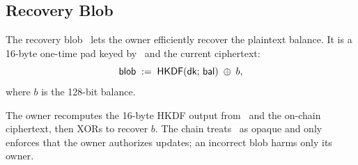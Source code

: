 \subsection{Recovery Blob}
\label{sec:recovery}

The recovery blob \blob\ lets the owner efficiently recover the plaintext balance.
It is a 16-byte one-time pad keyed by \dk\ and the current ciphertext:
%
\[
  \mathsf{blob} \;:=\; \mathsf{HKDF}(\textsf{dk};\, \mathsf{bal}) \;\oplus\; b,
\]
%
where $b$ is the 128-bit balance.

The owner recomputes the 16-byte HKDF output from \dk\ and the on-chain ciphertext, then XORs to recover $b$.
The chain treats \blob\ as opaque and only enforces that the owner authorizes updates; an incorrect blob harms only its owner.
